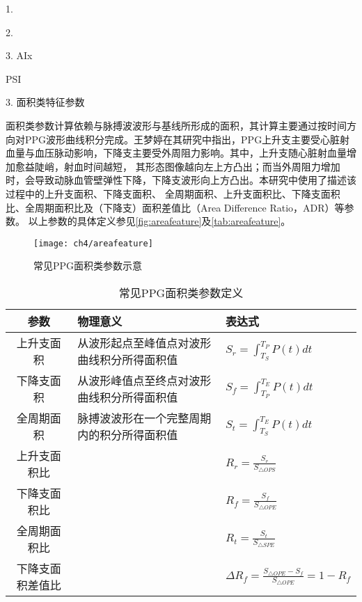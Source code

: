 1. 

2. 

3. AIx

PSI

3. 面积类特征参数

面积类参数计算依赖与脉搏波波形与基线所形成的面积，其计算主要通过按时间方向对PPG波形曲线积分完成。王梦婷在其研究中指出\cite{mmt}，PPG上升支主要受心脏射血量与血压脉动影响，下降支主要受外周阻力影响。其中，上升支随心脏射血量增加愈益陡峭，射血时间越短，
其形态图像越向左上方凸出；而当外周阻力增加时，会导致动脉血管壁弹性下降，下降支波形向上方凸出。本研究中使用了描述该过程中的上升支面积、下降支面积、
全周期面积、上升支面积比、下降支面积比、全周期面积比及（下降支）面积差值比（Area Difference Ratio，ADR）\cite{Feng2018}等参数。
以上参数的具体定义参见\autoref{fig:areafeature}及\autoref{tab:areafeature}。
\begin{figure}[htbp]
    \centering
    \texttt{[image: ch4/areafeature]}
    \caption{\label{fig:areafeature}常见PPG面积类参数示意}
\end{figure}

\begin{table}[htbp]
    \centering
    \caption{\label{tab:areafeature}常见PPG面积类参数定义}
    \begin{tabularx}{\linewidth}{cX<{\centering}X<{\centering}}
    \toprule
    \textbf{参数} & \textbf{物理意义} & \textbf{表达式} \\
    \midrule
    上升支面积      &  从波形起点至峰值点对波形曲线积分所得面积值         &  $S_r=\int_{T_S}^{T_P}P(t)dt$\\
    下降支面积      &  从波形峰值点至终点对波形曲线积分所得面积值         &  $S_f=\int_{T_P}^{T_E}P(t)dt$\\
    全周期面积      &  脉搏波波形在一个完整周期内的积分所得面积值         &  $S_t=\int_{T_S}^{T_E}P(t)dt$\\
    上升支面积比    &           &   $R_r=\frac{S_r}{S_{\triangle OPS}}$    \\
    下降支面积比    &           &   $R_f=\frac{S_f}{S_{\triangle OPE}}$    \\
    全周期面积比    &           &   $R_t=\frac{S_t}{S_{\triangle SPE}}$    \\
    下降支面积差值比&           &    $\Delta R_f=\frac{S_{\triangle OPE}-S_f}{S_{\triangle OPE}}=1-R_f$\\
    \bottomrule
    \end{tabularx}
\end{table}

